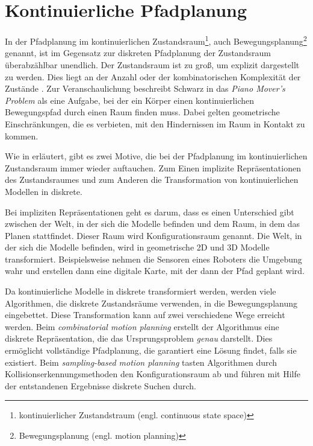 \section{Kontinuierliche Pfadplanung} \label{Kapitel 4.4}
In der Pfadplanung im kontinuierlichen Zustandsraum\footnote{kontinuierlicher Zustandstraum (engl. continuous state space)}, auch Bewegungsplanung\footnote{Bewegungsplanung (engl. motion planning)} genannt, ist im Gegensatz zur diskreten Pfadplanung der Zustandsraum überabzählbar unendlich.  Der Zustandsraum ist zu groß, um explizit dargestellt zu werden. Dies liegt an der Anzahl oder der kombinatorischen Komplexität der Zustände \cite[~S. 17]{Lav06}.
Zur Veranschaulichung beschreibt Schwarz in \cite{Schw83} das \textit{Piano Mover's Problem} als eine Aufgabe, bei der ein Körper einen kontinuierlichen Bewegungspfad durch einen Raum finden muss. Dabei gelten geometrische Einschränkungen, die es verbieten, mit den Hindernissen im Raum in Kontakt zu kommen.

Wie in \cite[~S. 79 f.]{Lav06} erläutert, gibt es zwei Motive, die bei der Pfadplanung im kontinuierlichen Zustandsraum immer wieder auftauchen. Zum Einen implizite Repräsentationen des Zustandsraumes und zum Anderen die Transformation von kontinuierlichen Modellen in diskrete.

Bei impliziten Repräsentationen geht es darum, dass es einen Unterschied gibt zwischen der Welt, in der sich die Modelle befinden und dem Raum, in dem das Planen stattfindet. Dieser Raum wird Konfigurationsraum genannt. Die Welt, in der sich die Modelle befinden, wird in geometrische 2D und 3D Modelle transformiert. Beispielsweise nehmen die Sensoren eines Roboters die Umgebung wahr und erstellen dann eine digitale Karte, mit der dann der Pfad geplant wird.

Da kontinuierliche Modelle in diskrete transformiert werden, werden viele Algorithmen, die diskrete Zustandsräume verwenden, in die Bewegungsplanung eingebettet. Diese Transformation kann auf zwei verschiedene Wege erreicht werden. Beim \textit{combinatorial motion planning} erstellt der Algorithmus eine diskrete Repräsentation, die das Ursprungsproblem \textit{genau} darstellt. Dies ermöglicht vollständige Pfadplanung, die garantiert eine Lösung findet, falls sie existiert. Beim \textit{sampling-based motion planning} tasten Algorithmen durch Kollisionserkennungsmethoden den Konfigurationsraum ab und führen mit Hilfe der entstandenen Ergebnisse diskrete Suchen durch.


